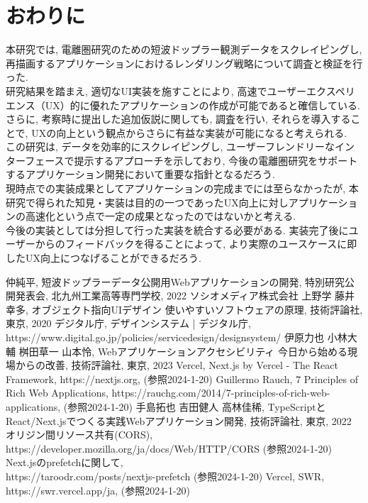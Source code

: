 \section{おわりに}
本研究では, 電離圏研究のための短波ドップラー観測データをスクレイピングし, 再描画するアプリケーションにおけるレンダリング戦略について調査と検証を行った. \\
研究結果を踏まえ, 適切なUI実装を施すことにより, 高速でユーザーエクスペリエンス（UX）的に優れたアプリケーションの作成が可能であると確信している. 
さらに, 考察時に提出した追加仮説に関しても, 調査を行い, それらを導入することで, UXの向上という観点からさらに有益な実装が可能になると考えられる. \\
この研究は, データを効率的にスクレイピングし, ユーザーフレンドリーなインターフェースで提示するアプローチを示しており, 今後の電離圏研究をサポートするアプリケーション開発において重要な指針となるだろう. \\
現時点での実装成果としてアプリケーションの完成までには至らなかったが, 本研究で得られた知見・実装は目的の一つであったUX向上に対しアプリケーションの高速化という点で一定の成果となったのではないかと考える.\\
今後の実装としては分担して行った実装を統合する必要がある. 実装完了後にユーザーからのフィードバックを得ることによって, より実際のユースケースに即したUX向上につなげることができるだろう.

\begin{thebibliography}{99}
	仲純平, 短波ドップラーデータ公開用Webアプリケーションの開発, 特別研究公開発表会, 北九州工業高等専門学校, 2022
	ソシオメディア株式会社 上野学 藤井幸多, オブジェクト指向UIデザイン 使いやすいソフトウェアの原理, 技術評論社, 東京, 2020
	デジタル庁, デザインシステム | デジタル庁, https://www.digital.go.jp/policies/servicedesign/designsystem/
	伊原力也 小林大輔 桝田草一 山本怜, Webアプリケーションアクセシビリティ 今日から始める現場からの改善, 技術評論社, 東京, 2023
	Vercel, Next.js by Vercel - The React Framework, https://nextjs.org, (参照2024-1-20)
	Guillermo Rauch, 7 Principles of Rich Web Applications, https://rauchg.com/2014/7-principles-of-rich-web-applications, (参照2024-1-20)
	手島拓也 吉田健人 高林佳稀, TypeScriptとReact/Next.jsでつくる実践Webアプリケーション開発, 技術評論社, 東京, 2022
	オリジン間リソース共有(CORS),\\ https://developer.mozilla.org/ja/docs/Web/HTTP/CORS (参照2024-1-20)
	Next.jsのprefetchに関して,\\ https://taroodr.com/posts/nextjs-prefetch (参照2024-1-20)
	Vercel, SWR, https://swr.vercel.app/ja, (参照2024-1-20)
\end{thebibliography}